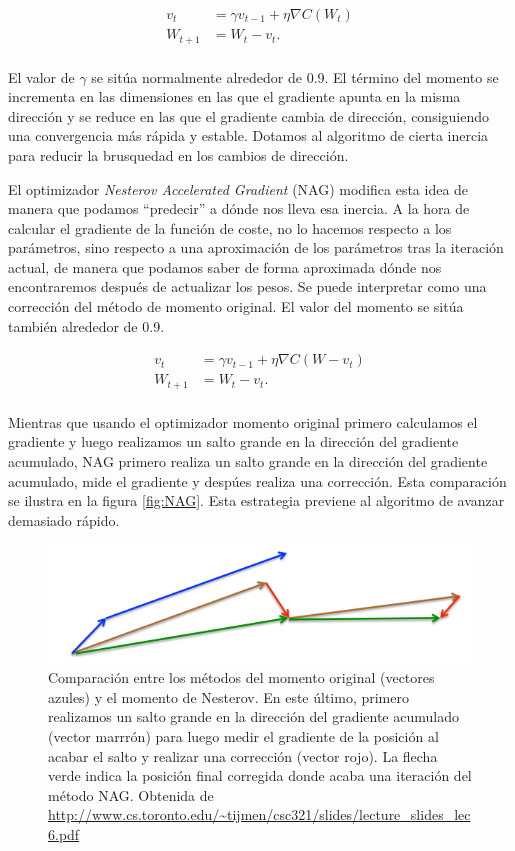 \begin{align*}	
	v_t&= \gamma v_{t-1} + \eta \nabla C(W_t) \\
	W_{t+1} &= W_t- v_t. \\
\end{align*}

El valor de $\gamma$ se sitúa normalmente alrededor de 0.9. El término del momento se incrementa en las dimensiones en las que el gradiente apunta en la misma dirección y se reduce en las que el gradiente cambia de dirección, consiguiendo una convergencia más rápida y estable. Dotamos al algoritmo de cierta inercia para reducir la brusquedad en los cambios de dirección.

El optimizador \textit{Nesterov Accelerated Gradient} (NAG) \cite{Nesterov} modifica esta idea de manera que podamos ``predecir'' a dónde nos lleva esa inercia. A la hora de calcular el gradiente de la función de coste, no lo hacemos respecto a los parámetros, sino respecto a una aproximación de los parámetros tras la iteración actual, de manera que podamos saber de forma aproximada dónde nos encontraremos después de actualizar los pesos. Se puede interpretar como una corrección del método de momento original. El valor del momento se sitúa también alrededor de 0.9.

\begin{align*}	
	v_t&= \gamma v_{t-1} + \eta \nabla C(W-v_t) \\
	W_{t+1} &= W_t - v_t. \\
\end{align*}

Mientras que usando el optimizador momento original primero calculamos el gradiente y luego realizamos un salto grande en la dirección del gradiente acumulado, NAG primero realiza un salto grande en la dirección del gradiente acumulado, mide el gradiente y despúes realiza una corrección. Esta comparación se ilustra en la figura \ref{fig:NAG}. Esta estrategia previene al algoritmo de avanzar demasiado rápido. 

\begin{figure}
    \centering
    \includegraphics[width=0.75\linewidth]{Plantilla_TFG_latex//imagenes//Inf//2.Fund/NAG.png}
    \caption{Comparación entre los métodos del momento original (vectores azules) y el momento de Nesterov. En este último, primero realizamos un salto grande en la dirección del gradiente acumulado (vector marrrón) para luego medir el gradiente de la posición al acabar el salto y realizar una corrección (vector rojo). La flecha verde indica la posición final corregida donde acaba una iteración del método NAG. Obtenida de \url{http://www.cs.toronto.edu/~tijmen/csc321/slides/lecture_slides_lec6.pdf}}
    \label{fig:resblock1x1}
\end{figure}


